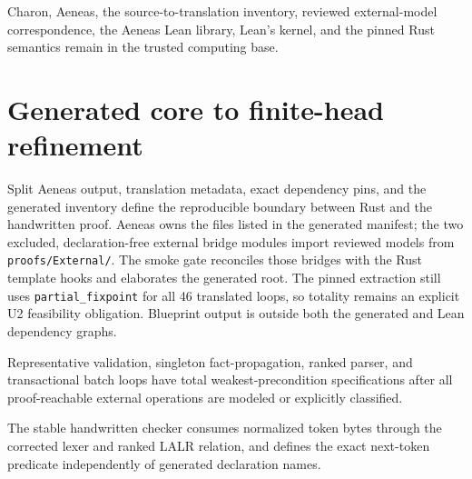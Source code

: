 \begin{assumption}
  \label{asm:trusted-computing-base}
  \notready
  Charon, Aeneas, the source-to-translation inventory, reviewed external-model
  correspondence, the Aeneas Lean library, Lean's kernel, and the pinned Rust
  semantics remain in the trusted computing base.
\end{assumption}

\section{Generated core to finite-head refinement}

\begin{definition}
  \label{def:generated-proof-boundary}
  \notready
  Split Aeneas output, translation metadata, exact dependency pins, and the
  generated inventory define the reproducible boundary between Rust and the
  handwritten proof.  Aeneas owns the files listed in the generated manifest;
  the two excluded, declaration-free external bridge modules import reviewed
  models from \texttt{proofs/External/}.  The smoke gate reconciles those
  bridges with the Rust template hooks and elaborates the generated root.  The
  pinned extraction still uses
  \texttt{partial\_fixpoint} for all 46 translated loops, so totality remains
  an explicit U2 feasibility obligation.  Blueprint output is outside both the
  generated and Lean dependency graphs.
\end{definition}

\begin{proposition}
  \label{prop:feasibility-gate}
  \leanok
  Representative validation, singleton fact-propagation, ranked parser, and
  transactional batch loops have total weakest-precondition specifications
  after all proof-reachable external operations are modeled or explicitly
  classified.
\end{proposition}

\begin{definition}
  \label{def:finite-head-checker}
  The stable handwritten checker consumes normalized token bytes through the
  corrected lexer and ranked LALR relation, and defines the exact next-token
  predicate independently of generated declaration names.
\end{definition}

